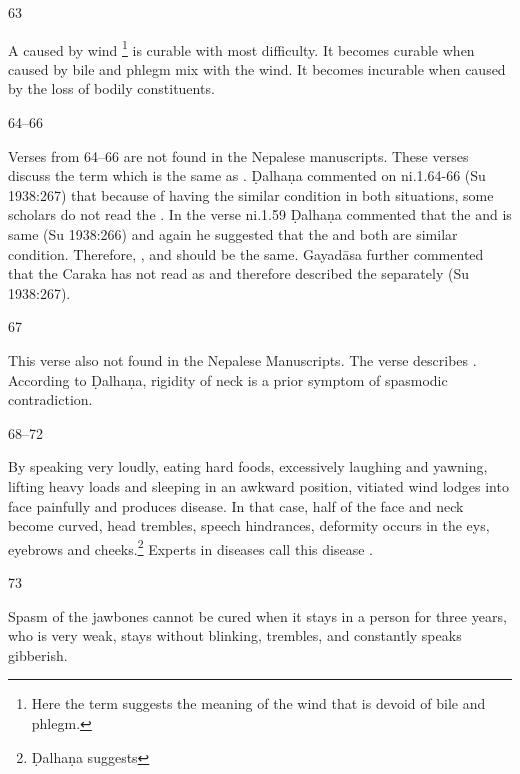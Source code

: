 \begin{translation}
\item[63]

	A  caused by wind \footnote{Here the term
	 suggests the meaning of the wind that is devoid of bile and
	phlegm.} is curable with most difficulty. It becomes curable when caused
	by bile and phlegm mix with the wind. It becomes incurable when caused
	by the loss of bodily constituents.

\item[64--66]

	Verses from 64--66 are not found in the Nepalese manuscripts.  These
	verses discuss the term  which
	is the same as . Ḍalhaṇa commented on ni.1.64-66 (Su
	1938:267) that because of having the similar condition in both
	situations, some scholars do not read the . In the verse
	ni.1.59 Ḍalhaṇa commented that the  and  is same
	(Su 1938:266) and again he suggested that the  and
	 both are similar condition. Therefore, ,
	 and  should be the same. Gayadāsa further
	commented that the Caraka has not read  as  and
	therefore described the  separately (Su 1938:267).

\item[67]

	This verse also not found in the Nepalese Manuscripts. The verse
	describes . According to Ḍalhaṇa,
	rigidity of neck is a prior symptom of spasmodic contradiction. 

\item[68--72]

	By speaking very loudly, eating hard foods, excessively laughing and
	yawning, lifting heavy loads and sleeping in an awkward position,
	vitiated wind lodges into face painfully and produces
	 disease. In that case, half of
	the face and neck become curved, head trembles, speech hindrances,
	deformity occurs in the eys, eyebrows and cheeks.\footnote{Ḍalhaṇa
	suggests } Experts in
	diseases call this disease . 

\item[73]

	Spasm of the jawbones cannot be cured when it stays in a person for
	three years, who is very weak, stays without blinking, trembles, and
	constantly speaks gibberish.


\end{translation}
